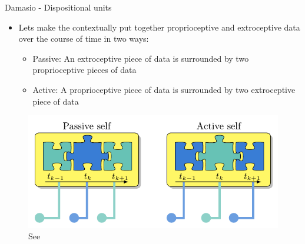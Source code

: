 \documentclass[handout]{beamer}
\begin{document}
\begin{frame}{Damasio - Dispositional units}
	\begin{itemize}
		\item Lets make the contextually put together proprioceptive and extroceptive data over the course of time in two ways:
			\begin{itemize}
				\item Passive: An extroceptive piece of data is surrounded by two proprioceptive pieces of data
				\item Active: A proprioceptive piece of data is surrounded by two extroceptive piece of data 
			\end{itemize}
	\end{itemize}
	\begin{figure}
		\includegraphics[scale=0.3]{regazzoni-2020-multi-sensorial-generative-and-descriptive-self-awareness-models-for-autonomous-systems-fig-2.png}
		\caption{See \cite{regazzoni-2020-multi-sensorial-generative-and-descriptive-self-awareness-models-for-autonomous-systems}}
	\end{figure}
\end{frame}
\end{document}
